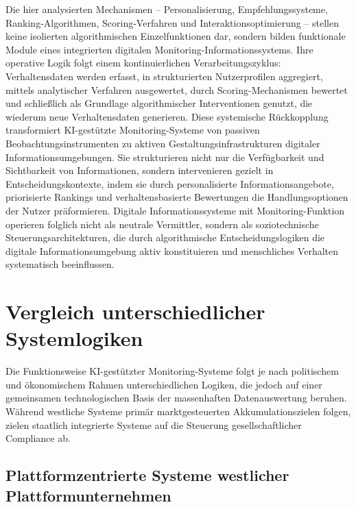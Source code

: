 Die hier analysierten Mechanismen -- Personalisierung, Empfehlungssysteme, Ranking-Algorithmen, Scoring-Verfahren und Interaktionsoptimierung -- stellen keine isolierten algorithmischen Einzelfunktionen dar, sondern bilden funktionale Module eines integrierten digitalen Monitoring-Informationssystems. Ihre operative Logik folgt einem kontinuierlichen Verarbeitungszyklus: Verhaltensdaten werden erfasst, in strukturierten Nutzerprofilen aggregiert, mittels analytischer Verfahren ausgewertet, durch Scoring-Mechanismen bewertet und schließlich als Grundlage algorithmischer Interventionen genutzt, die wiederum neue Verhaltensdaten generieren. Diese systemische Rückkopplung transformiert \ac{KI}-gestützte Monitoring-Systeme von passiven Beobachtungsinstrumenten zu aktiven Gestaltungsinfrastrukturen digitaler Informationsumgebungen. Sie strukturieren nicht nur die Verfügbarkeit und Sichtbarkeit von Informationen, sondern intervenieren gezielt in Entscheidungskontexte, indem sie durch personalisierte Informationsangebote, priorisierte Rankings und verhaltensbasierte Bewertungen die Handlungsoptionen der Nutzer präformieren. Digitale Informationssysteme mit Monitoring-Funktion operieren folglich nicht als neutrale Vermittler, sondern als soziotechnische Steuerungsarchitekturen, die durch algorithmische Entscheidungslogiken die digitale Informationsumgebung aktiv konstituieren und menschliches Verhalten systematisch beeinflussen.

\section{Vergleich unterschiedlicher Systemlogiken}

Die Funktionsweise \ac{KI}-gestützter Monitoring-Systeme folgt je nach politischem und ökonomischem Rahmen unterschiedlichen Logiken, die jedoch auf einer gemeinsamen technologischen Basis der massenhaften Datenauswertung beruhen. Während westliche Systeme primär marktgesteuerten Akkumulationszielen folgen, zielen staatlich integrierte Systeme auf die Steuerung gesellschaftlicher Compliance ab.

\subsection{Plattformzentrierte Systeme westlicher Plattformunternehmen}

